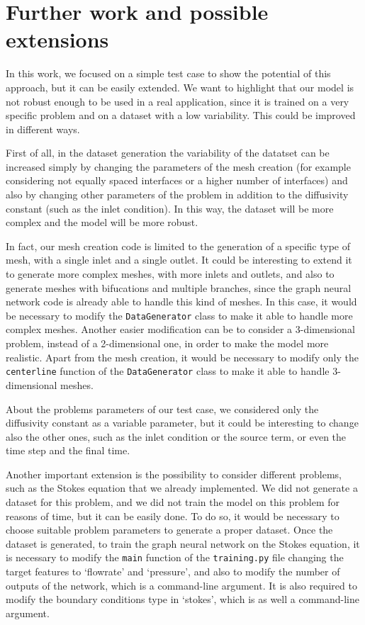 \documentclass[11pt,a4paper]{article}
\begin{document}


\section{Further work and possible extensions}
In this work, we focused on a simple test case to show the potential of this approach, but it can be easily extended. We want to highlight that our model is not robust enough to be used in a real application, since it is trained on a very specific problem and on a dataset with a low variability. This could be improved in different ways.

First of all, in the dataset generation the variability of the datatset can be increased simply by changing the parameters of the mesh creation (for example considering not equally spaced interfaces or a higher number of interfaces) and also by changing other parameters of the problem in addition to the diffusivity constant (such as the inlet condition). 
In this way, the dataset will be more complex and the model will be more robust. 

In fact, our mesh creation code is limited to the generation of a specific type of mesh, with a single inlet and a single outlet. It could be interesting to extend it to generate more complex meshes, with more inlets and outlets, and also to generate meshes with bifucations and multiple branches, since the graph neural network code is already able to handle this kind of meshes. In this case, it would be necessary to modify the \texttt{DataGenerator} class to make it able to handle more complex meshes. 
Another easier modification can be to consider a 3-dimensional problem, instead of a 2-dimensional one, in order to make the model more realistic. Apart from the mesh creation, it would be necessary to modify only the \texttt{centerline}  function of the \texttt{DataGenerator} class to make it able to handle 3-dimensional meshes.

About the problems parameters of our test case, we considered only the diffusivity constant as a variable parameter, but it could be interesting to change also the other ones, such as the inlet condition or the source term, or even the time step and the final time. 

Another important extension is the possibility to consider different problems, such as the Stokes equation that we already implemented. We did not generate a dataset for this problem, and we did not train the model on this problem for reasons of time, but it can be easily done. To do so, it would be necessary to choose suitable problem parameters to generate a proper dataset. 
Once the dataset is generated, to train the graph neural network on the Stokes equation, it is necessary to modify the \texttt{main} function of the \texttt{training.py} file changing the target features to `flowrate' and `pressure', and also to modify the number of outputs of the network, which is a command-line argument. It is also required to modify the boundary conditions type in `stokes', which is as well a command-line argument.
\end{document}
